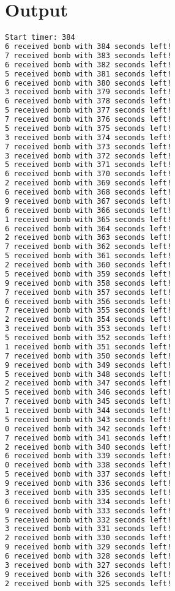 \documentclass{article}
\begin{document}
\section{Output}
\begin{lstlisting}[language=bash]
Start timer: 384
6 received bomb with 384 seconds left!
7 received bomb with 383 seconds left!
6 received bomb with 382 seconds left!
5 received bomb with 381 seconds left!
6 received bomb with 380 seconds left!
3 received bomb with 379 seconds left!
6 received bomb with 378 seconds left!
5 received bomb with 377 seconds left!
7 received bomb with 376 seconds left!
5 received bomb with 375 seconds left!
3 received bomb with 374 seconds left!
7 received bomb with 373 seconds left!
3 received bomb with 372 seconds left!
5 received bomb with 371 seconds left!
6 received bomb with 370 seconds left!
2 received bomb with 369 seconds left!
6 received bomb with 368 seconds left!
9 received bomb with 367 seconds left!
6 received bomb with 366 seconds left!
1 received bomb with 365 seconds left!
6 received bomb with 364 seconds left!
2 received bomb with 363 seconds left!
7 received bomb with 362 seconds left!
5 received bomb with 361 seconds left!
2 received bomb with 360 seconds left!
5 received bomb with 359 seconds left!
9 received bomb with 358 seconds left!
7 received bomb with 357 seconds left!
6 received bomb with 356 seconds left!
7 received bomb with 355 seconds left!
2 received bomb with 354 seconds left!
3 received bomb with 353 seconds left!
5 received bomb with 352 seconds left!
1 received bomb with 351 seconds left!
7 received bomb with 350 seconds left!
9 received bomb with 349 seconds left!
5 received bomb with 348 seconds left!
2 received bomb with 347 seconds left!
5 received bomb with 346 seconds left!
7 received bomb with 345 seconds left!
1 received bomb with 344 seconds left!
5 received bomb with 343 seconds left!
0 received bomb with 342 seconds left!
7 received bomb with 341 seconds left!
2 received bomb with 340 seconds left!
6 received bomb with 339 seconds left!
0 received bomb with 338 seconds left!
5 received bomb with 337 seconds left!
9 received bomb with 336 seconds left!
3 received bomb with 335 seconds left!
6 received bomb with 334 seconds left!
9 received bomb with 333 seconds left!
5 received bomb with 332 seconds left!
3 received bomb with 331 seconds left!
2 received bomb with 330 seconds left!
9 received bomb with 329 seconds left!
6 received bomb with 328 seconds left!
3 received bomb with 327 seconds left!
9 received bomb with 326 seconds left!
2 received bomb with 325 seconds left!

\end{lstlisting}
\end{document}
